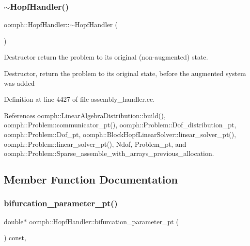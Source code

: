 \subsubsection{\texorpdfstring{$\sim$\+Hopf\+Handler()}{~HopfHandler()}}
{\footnotesize\ttfamily oomph\+::\+Hopf\+Handler\+::$\sim$\+Hopf\+Handler (\begin{DoxyParamCaption}{ }\end{DoxyParamCaption})}



Destructor return the problem to its original (non-\/augmented) state. 

Destructor, return the problem to its original state, before the augmented system was added 

Definition at line 4427 of file assembly\+\_\+handler.\+cc.



References oomph\+::\+Linear\+Algebra\+Distribution\+::build(), oomph\+::\+Problem\+::communicator\+\_\+pt(), oomph\+::\+Problem\+::\+Dof\+\_\+distribution\+\_\+pt, oomph\+::\+Problem\+::\+Dof\+\_\+pt, oomph\+::\+Block\+Hopf\+Linear\+Solver\+::linear\+\_\+solver\+\_\+pt(), oomph\+::\+Problem\+::linear\+\_\+solver\+\_\+pt(), Ndof, Problem\+\_\+pt, and oomph\+::\+Problem\+::\+Sparse\+\_\+assemble\+\_\+with\+\_\+arrays\+\_\+previous\+\_\+allocation.



\subsection{Member Function Documentation}
\mbox{\label{classoomph_1_1HopfHandler_a49f4d0a78ac46ea1412d71d3bb9cc6a1}} 
\subsubsection{\texorpdfstring{bifurcation\+\_\+parameter\+\_\+pt()}{bifurcation\_parameter\_pt()}}
{\footnotesize\ttfamily double$\ast$ oomph\+::\+Hopf\+Handler\+::bifurcation\+\_\+parameter\+\_\+pt (\begin{DoxyParamCaption}{ }\end{DoxyParamCaption}) const\hspace{0.3cm}{\ttfamily [inline]}, {\ttfamily [virtual]}}



